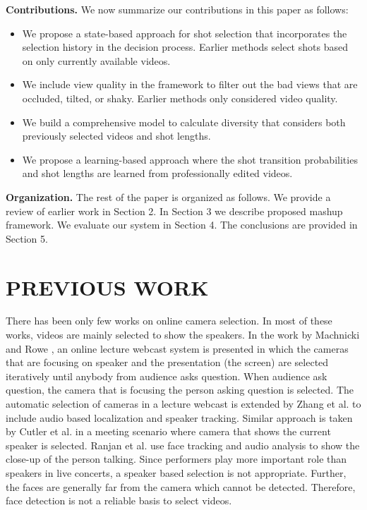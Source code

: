 \documentclass{sig-alternate}
\begin{document}
\textbf{Contributions.} We now summarize our contributions in this paper
as follows:

\begin{itemize}
    \item We propose a state-based approach for shot selection that incorporates
the selection history in the decision process. Earlier methods select shots based on only currently available
videos.
    \item  We include view quality in the framework to filter out the
bad views that are occluded, tilted, or shaky. Earlier methods
only considered video quality.
    \item We build a comprehensive model to calculate diversity that
considers both previously selected videos and shot lengths.
    \item We propose a learning-based approach where the shot transition
probabilities and shot lengths are learned from professionally
edited videos.
\end{itemize}

\textbf{Organization.} The rest of the paper is organized as follows.
We provide a review of earlier work in Section 2. In Section 3 we
describe proposed mashup framework. We evaluate our system in
Section 4. The conclusions are provided in Section 5.


\section{PREVIOUS WORK}
There has been only few works on online camera selection. In
most of these works, videos are mainly selected to show the speakers.
In the work by Machnicki and Rowe \cite{saini2012movimash}, an online lecture
webcast system is presented in which the cameras that are focusing
on speaker and the presentation (the screen) are selected iteratively
until anybody from audience asks question. When audience ask
question, the camera that is focusing the person asking question is
selected. The automatic selection of cameras in a lecture webcast
is extended by Zhang et al. \cite{saini2012movimash} to include audio based localization
and speaker tracking. Similar approach is taken by Cutler et al. \cite{saini2012movimash}
in a meeting scenario where camera that shows the current speaker
is selected. Ranjan et al. \cite{saini2012movimash} use face tracking and audio analysis
to show the close-up of the person talking. Since performers
play more important role than speakers in live concerts, a speaker
based selection is not appropriate. Further, the faces are generally
far from the camera which cannot be detected. Therefore, face detection
is not a reliable basis to select videos.
\end{document}
